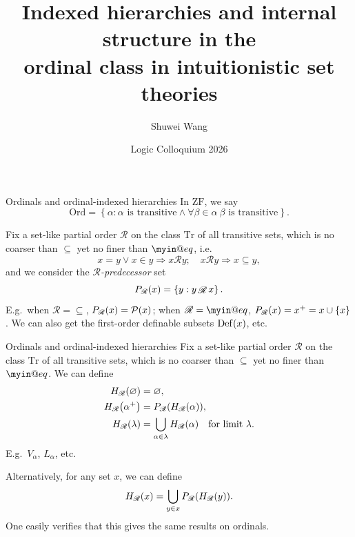\documentclass{beamer}
\title[Indexed hierarchies and the ordinal class]{Indexed hierarchies and internal structure in the\\ordinal class in intuitionistic set theories}
\author{Shuwei Wang}
\institute{University of Leeds}
\date[LC26]{\small Logic Colloquium 2026\\\DTMdate{2026-06-30}}
\makeatletter
\newcommand{\ZF}{\mathrm{ZF}}
\newcommand{\Tr}{\mathrm{Tr}}
\newcommand{\Ord}{\mathrm{Ord}}
\DeclareMathOperator{\Def}{Def}
\def\myineq{\mathrel{\mathpalette\myin@eq\relax}}
\def\myin@eq#1#2{%
  \setbox\myin@eqfst=\hbox{\m@th$#1\in$}%
  \setbox\myin@eqsnd=\hb@xt@\wd\myin@eqfst{\m@th$#1\dabar@$\hss$#1\dabar@$}%
  \vcenter{\offinterlineskip%
    \box\myin@eqfst\vskip-.1\ht\myin@eqsnd%
    \copy\myin@eqsnd\vskip-.5\ht\myin@eqsnd}}
\makeatother
\begin{document}
\begin{frame}
  \titlepage
\end{frame}

\begin{frame}{Ordinals and ordinal-indexed hierarchies}
  In $\ZF$, we say
  \[\Ord = \left\{\alpha : \text{$\alpha$ is transitive} \land \forall \beta \in \alpha \ \text{$\beta$ is transitive}\right\}.\]

  \pause

  Fix a set-like partial order $\mathscr{R}$ on the class $\Tr$ of all transitive sets, which is no coarser than $\subseteq$ yet no finer than $\myineq$, i.e.
  \[x = y \lor x \in y \Longrightarrow x \mathscr{R} y; \quad x \mathscr{R} y \Longrightarrow x \subseteq y,\]
  and we consider the \emph{$\mathscr{R}$-predecessor} set
  \[P_\mathscr{R}\mleft(x\mright) = \left\{y : y \mathop{\mathscr{R}} x\right\}.\]
  E.g.\ when $\mathscr{R} = {\subseteq}$, $P_\mathscr{R}\mleft(x\mright) = \mathcal{P}\mleft(x\mright)$; when $\mathscr{R} = {\myineq}$, $P_\mathscr{R}\mleft(x\mright) = x^+ = x \cup \left\{x\right\}$. We can also get the first-order definable subsets $\Def\mleft(x\mright)$, etc.
\end{frame}

\begin{frame}{Ordinals and ordinal-indexed hierarchies}
  Fix a set-like partial order $\mathscr{R}$ on the class $\Tr$ of all transitive sets, which is no coarser than $\subseteq$ yet no finer than $\myineq$. We can define
  \begin{align*}
    H_\mathscr{R}\mleft(\varnothing\mright) & = \varnothing,                                                                                      \\
    H_\mathscr{R}\mleft(\alpha^+\mright)    & = P_\mathscr{R}\mleft(H_\mathscr{R}\mleft(\alpha\mright)\mright),                                   \\
    H_\mathscr{R}\mleft(\lambda\mright)     & = \bigcup_{\alpha \in \lambda} H_\mathscr{R}\mleft(\alpha\mright) \quad \text{for limit $\lambda$}.
  \end{align*}
  E.g.\ $V_\alpha$, $L_\alpha$, etc.

  \pause

  \vspace{1em}

  Alternatively, for any set $x$, we can define
  \[H_\mathscr{R}\mleft(x\mright) = \bigcup_{y \in x} P_\mathscr{R}\mleft(H_\mathscr{R}\mleft(y\mright)\mright).\]
  One easily verifies that this gives the same results on ordinals.
\end{frame}
\end{document}
